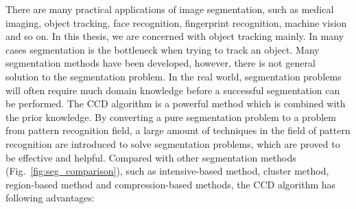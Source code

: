 There are many practical
applications of image segmentation, such as medical imaging, object
tracking, face recognition, fingerprint recognition, machine vision and
so on. In this thesis, we are concerned with object tracking mainly.
In many cases segmentation is the bottleneck when trying to track an
object. Many segmentation methods have been developed, however, there is not
general solution to the segmentation problem. In the real world,
segmentation problems will often require much domain knowledge before
a successful segmentation can be performed. The CCD algorithm is a
powerful method which is combined with the prior knowledge. By
converting a pure segmentation problem to a problem from pattern
recognition field, a large amount of techniques in the field of pattern
recognition are introduced to solve segmentation problems, which are
proved to be effective and helpful. Compared with other segmentation
methods (Fig.~\ref{fig:seg_comparison}), such as intensive-based method,  cluster method, region-based
method and compression-based methods, the CCD algorithm has following
advantages:
